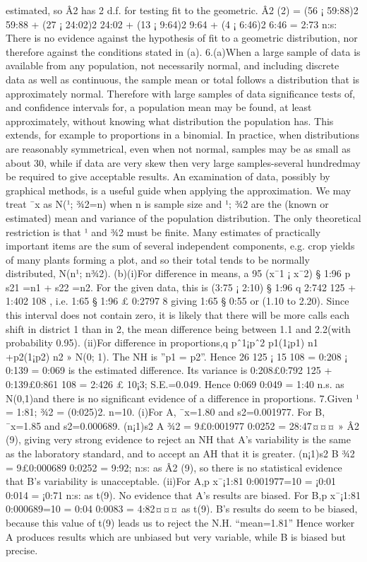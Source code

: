 \documentclass{article}
\begin{document}
estimated, so Â2 has 2 d.f. for testing fit to the geometric.
Â2
(2) =
(56 ¡ 59:88)2
59:88
+
(27 ¡ 24:02)2
24:02
+
(13 ¡ 9:64)2
9:64
+
(4 ¡ 6:46)2
6:46
= 2:73 n:s:
There is no evidence against the hypothesis of fit to a geometric distribution, nor therefore against
the conditions stated in (a).
6.(a)When a large sample of data is available from any population, not necessarily normal, and
including discrete data as well as continuous, the sample mean or total follows a distribution that
is approximately normal. Therefore with large samples of data significance tests of, and confidence
intervals for, a population mean may be found, at least approximately, without knowing what
distribution the population has. This extends, for example to proportions in a binomial.
In practice, when distributions are reasonably symmetrical, even when not normal, samples
may be as small as about 30, while if data are very skew then very large samples-several hundredmay
be required to give acceptable results. An examination of data, possibly by graphical methods,
is a useful guide when applying the approximation.
We may treat ¯x as N(¹; ¾2=n) when n is sample size and ¹; ¾2 are the (known or estimated)
mean and variance of the population distribution. The only theoretical restriction is that ¹ and
¾2 must be finite.
Many estimates of practically important items are the sum of several independent components,
e.g. crop yields of many plants forming a plot, and so their total tends to be normally distributed,
N(n¹; n¾2).
(b)(i)For difference in means, a 95%
(x¯1 ¡ x¯2) § 1:96
p
s21
=n1 + s22
=n2.
For the given data, this is (3:75 ¡ 2:10) § 1:96
q
2:742
125 + 1:402
108 , i.e. 1:65 § 1:96 £ 0:2797
8
giving 1:65 § 0:55 or (1.10 to 2.20).
Since this interval does not contain zero, it is likely that there will be more calls each shift in
district 1 than in 2, the mean difference being between 1.1 and 2.2(with probability 0.95).
(ii)For difference in proportions,q pˆ1¡pˆ2
p1(1¡p1)
n1
+p2(1¡p2)
n2
» N(0; 1).
The NH is ”p1 = p2”.
Hence 26
125 ¡ 15
108 = 0:208 ¡ 0:139 = 0:069 is the estimated difference.
Its variance is 0:208£0:792
125 + 0:139£0:861
108 = 2:426 £ 10¡3; S.E.=0.049.
Hence 0:069
0:049 = 1:40 n.s. as N(0,1)and there is no significant evidence of a difference in proportions.
7.Given ¹ = 1:81; ¾2 = (0:025)2. n=10.
(i)For A, ¯x=1.80 and s2=0.001977.
For B, ¯x=1.85 and s2=0.000689.
(n¡1)s2
A
¾2 = 9£0:001977
0:0252 = 28:47¤¤¤ » Â2
(9), giving very strong evidence to reject an NH that A’s
variability is the same as the laboratory standard, and to accept an AH that it is greater.
(n¡1)s2
B
¾2 = 9£0:000689
0:0252 = 9:92; n:s: as Â2
(9), so there is no statistical evidence that B’s variability
is unacceptable.
(ii)For A,p x¯¡1:81
0:001977=10
= ¡0:01
0:014 = ¡0:71 n:s: as t(9).
No evidence that A’s results are biased.
For B,p x¯¡1:81
0:000689=10
= 0:04
0:0083 = 4:82¤¤¤ as t(9).
B’s results do seem to be biased, because this value of t(9) leads us to reject the N.H. “mean=1.81”
Hence worker A produces results which are unbiased but very variable, while B is biased but precise.
\end{document}

